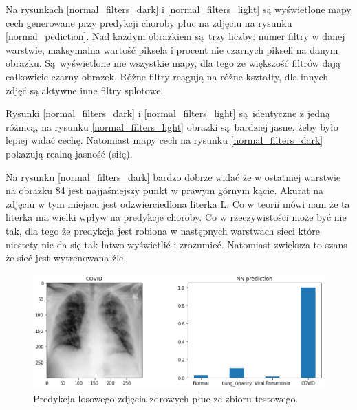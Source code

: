 \documentclass{article}
\begin{document}
Na rysunkach \ref{normal_filters_dark} i \ref{normal_filters_light} są wyświetlone mapy cech generowane przy predykcji choroby płuc na zdjęciu na rysunku \ref{normal_pediction}. Nad każdym obrazkiem są trzy liczby: numer filtry w danej warstwie, maksymalna wartość piksela i procent nie czarnych pikseli na danym obrazku. Są wyświetlone nie wszystkie mapy, dla tego że większość filtrów dają całkowicie czarny obrazek. Różne filtry reagują na różne kształty, dla innych zdjęć są aktywne inne filtry splotowe.

Rysunki \ref{normal_filters_dark} i \ref{normal_filters_light} są identyczne z jedną różnicą, na rysunku \ref{normal_filters_light} obrazki są bardziej jasne, żeby było lepiej widać cechę. Natomiast mapy cech na rysunku \ref{normal_filters_dark} pokazują realną jasność (siłę).

Na rysunku \ref{normal_filters_dark} bardzo dobrze widać że w ostatniej warstwie na obrazku 84 jest najjaśniejszy punkt w prawym górnym kącie. Akurat na zdjęciu w tym miejscu jest odzwierciedlona literka L. Co w teorii mówi nam że ta literka ma wielki wpływ na predykcje choroby. Co w rzeczywistości może być nie tak, dla tego że predykcja jest robiona w następnych warstwach sieci które niestety nie da się tak łatwo wyświetlić i zrozumieć. Natomiast zwiększa to szans że sieć jest wytrenowana źle.  


\begin{figure}[H]
	\centering
	\includegraphics[width=1\textwidth,keepaspectratio=true]{covid_prediction}
	\caption{Predykcja losowego zdjęcia zdrowych płuc ze zbioru testowego.}
	\label{covid_pediction}
\end{figure}
\end{document}
